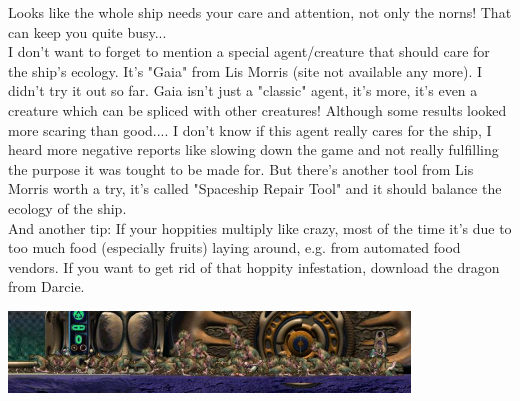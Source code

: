 \documentclass[11pt,twoside,a4paper]{article}
\begin{document}
{	Looks like the whole ship needs your care and attention, not only the norns! That can keep you quite busy... ~\\ 
	
	I don't want to forget to mention a special agent/creature that should care for the ship's ecology. It's "Gaia" from Lis Morris (site not available any more). I didn't try it out so far. Gaia isn't just a "classic" agent, it's more, it's even a creature which can be spliced with other creatures! Although some results looked more scaring than good.... I don't know if this agent really cares for the ship, I heard more negative reports like slowing down the game and not really fulfilling the purpose it was tought to be made for. But there's another tool from Lis Morris worth a try, it's called "Spaceship Repair Tool" and it should balance the ecology of the ship. ~\\ 
	
	And another tip: If your hoppities multiply like crazy, most of the time it's due to too much food (especially fruits) laying around, e.g. from automated food vendors. If you want to get rid of that hoppity infestation, download the dragon from Darcie. ~\\ 
	
	\begin{center} \includegraphics[width=0.80\textwidth]{img/ueberbev.jpg} \end{center}

} %

\clearpage

\end{document}
